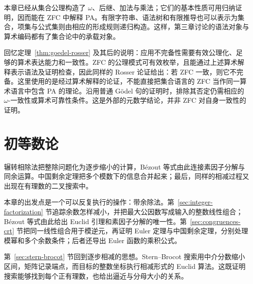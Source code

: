 \documentclass[lang=cn,a4paper,fontset=none,zihao=false,10pt,openany,twoside]{beautybook}
\numberwithin{algorithm}{chapter}
\begin{document}
\begin{remark}[与算术中的语法编码对照]
本章已经从集合公理构造了 $\omega$、后继、加法与乘法；它们的基本性质可用归纳证明，因而能在 ZFC 中解释 PA。有限字符串、语法树和有限推导也可以表示为集合，项集与公式集则由相应的形成规则递归构造。这样，第三章讨论的语法对象与算术编码都有了集合论中的承载对象。

回忆定理~\ref{thm:goedel-rosser} 及其后的说明：应用不完备性需要有效公理化、足够的算术表达能力和一致性。ZFC 的公理模式可有效枚举，且能通过上述算术解释表示语法及证明检查，因此同样的 Rosser 论证给出：若 ZFC 一致，则它不完备。这里使用的是经过算术解释的论证，不能直接把集合语言的 ZFC 当作同一算术语言中包含 PA 的理论。沿用普通 Gödel 句的证明时，排除其否定仍需相应的 $\omega$-一致性或算术可靠性条件。这是外部的元数学结论，并非 ZFC 对自身一致性的证明。
\end{remark}

\chapter{初等数论}\label{chap:elementary-number-theory}
\begin{wenxintishi}
辗转相除法把整除问题化为逐步缩小的计算，Bézout 等式由此连接素因子分解与同余运算。中国剩余定理把多个模数下的信息合并起来；最后，同样的相减过程又出现在有理数的二叉搜索中。
\end{wenxintishi}
本章的出发点是一个可以反复执行的操作：带余除法。第~\ref{sec:integer-factorization} 节追踪余数怎样减小，并把最大公因数写成输入的整数线性组合；Bézout 等式由此给出 Euclid 引理和素因子分解的唯一性。第~\ref{sec:congruences-crt} 节把同一线性组合用于模逆元，再证明 Euler 定理与中国剩余定理，分别处理模幂和多个余数条件；后者还导出 Euler 函数的乘积公式。

第~\ref{sec:stern-brocot} 节回到逐步相减的思想。Stern--Brocot 搜索用中介分数缩小区间，矩阵记录端点，而目标的整数坐标执行相减形式的 Euclid 算法。这既证明搜索能够找到每个正有理数，也给出逼近与分母大小的关系。

\begin{center}
\end{center}
\end{document}
